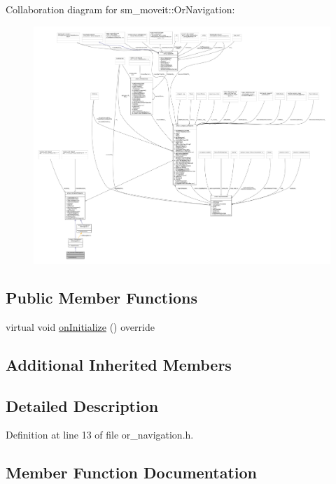 Collaboration diagram for sm\+\_\+moveit\+:\+:Or\+Navigation\+:
\nopagebreak
\begin{figure}[H]
\begin{center}
\leavevmode
\includegraphics[width=350pt]{classsm__moveit_1_1OrNavigation__coll__graph}
\end{center}
\end{figure}
\subsection*{Public Member Functions}
\begin{DoxyCompactItemize}
\item 
virtual void \hyperlink{classsm__moveit_1_1OrNavigation_a242ad8c4d031d2fae3343e8a46bfec57}{on\+Initialize} () override
\end{DoxyCompactItemize}
\subsection*{Additional Inherited Members}


\subsection{Detailed Description}


Definition at line 13 of file or\+\_\+navigation.\+h.



\subsection{Member Function Documentation}
\mbox{\label{classsm__moveit_1_1OrNavigation_a242ad8c4d031d2fae3343e8a46bfec57}} 
